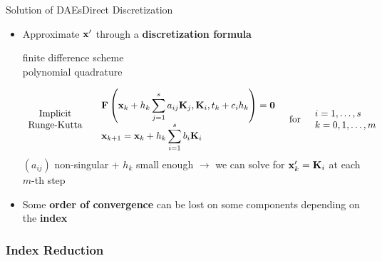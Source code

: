 \begin{frame}{Solution of \aclp{DAE}}{Direct Discretization}
  \begin{itemize}[<+->]
    \item Approximate $\mathbf{x}^\prime$ through a \textbf{discretization formula} \\
    \begin{small}
      \qquad finite difference scheme \\
      \qquad polynomial quadrature
    \end{small}
    \begin{equation*}
      \begin{array}{c}
        \text{Implicit} \\
        \text{Runge-Kutta}
      \end{array}
      \quad
      \begin{array}{l}
        \mathbf{F}\left(\mathbf{x}_{k} + h_k\displaystyle\sum_{j=1}^{s}a_{ij} \mathbf{K}_j, \mathbf{K}_i, t_{k} + c_i h_k\right) = \mathbf{0} \\[0.5em]
        \mathbf{x}_{k+1} = \mathbf{x}_{k} + h_k\displaystyle\sum_{i=1}^{s} b_i \mathbf{K}_i
      \end{array}
      \quad \text{for} \quad
      \begin{array}{l}
        i = 1, \dots, s \\
        k = 0, 1, \dots, m
      \end{array}
    \end{equation*}
    $(a_{ij})$ non-singular + $h_k$ small enough $\rightarrow$ we can solve for $\mathbf{x}^\prime_k = \mathbf{K}_i$ at each $m$-th step
    \item[\textcolor{mycolor3}{\faExclamationTriangle}] Some \textbf{order of convergence} can be lost on some components depending on the \textcolor{mycolor2!95!black}{\textbf{index}}
  \end{itemize}
  \vspace{0.5em}
\end{frame}

\subsubsection{Index Reduction}

